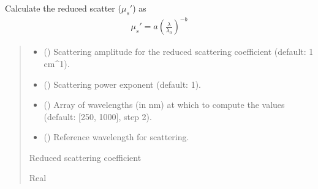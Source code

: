 \documentclass[letterpaper,10pt,english]{sphinxmanual}
\begin{document}

\begin{fulllineitems}
\label{\detokenize{generated/photon_canon.contrib.bio:photon_canon.contrib.bio.inverse_power_law_for_reduced_scattering}}
\pysigstartsignatures
\pysiglinewithargsret
{}
{\sphinxparamcomma {}\sphinxparamcomma {}\sphinxparamcomma {}}
{}
\pysigstopsignatures
\sphinxAtStartPar
Calculate the reduced scatter (\(\mu_s'\)) as
\begin{equation*}
\begin{split}\mu_s' = a\left(\frac{\lambda}{\lambda_0}\right)^{-b}\end{split}
\end{equation*}\begin{quote}\begin{description}
\begin{itemize}
\item {} 
\sphinxAtStartPar
{} () \textendash{} Scattering amplitude for the reduced scattering coefficient (default: 1 cm\textasciicircum{}\sphinxhyphen{}1).

\item {} 
\sphinxAtStartPar
{} () \textendash{} Scattering power exponent (default: 1).

\item {} 
\sphinxAtStartPar
{} (\sphinxstyleliteralemphasis{\sphinxupquote{{[}}}\sphinxstyleliteralemphasis{\sphinxupquote{{]}}}) \textendash{} Array of wavelengths (in nm) at which to compute the values (default: {[}250, 1000{]}, step 2).

\item {} 
\sphinxAtStartPar
{} () \textendash{} Reference wavelength for scattering.

\end{itemize}

\sphinxAtStartPar
Reduced scattering coefficient

\sphinxAtStartPar
Real

\end{description}\end{quote}

\end{fulllineitems}
\end{document}
